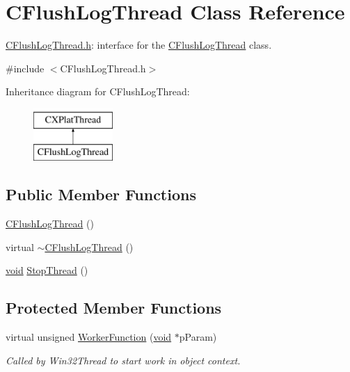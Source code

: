 \hypertarget{class_c_flush_log_thread}{\section{\-C\-Flush\-Log\-Thread \-Class \-Reference}
\label{class_c_flush_log_thread}
}


\hyperlink{_c_flush_log_thread_8h}{\-C\-Flush\-Log\-Thread.\-h}\-: interface for the \hyperlink{class_c_flush_log_thread}{\-C\-Flush\-Log\-Thread} class.  




{\ttfamily \#include $<$\-C\-Flush\-Log\-Thread.\-h$>$}

\-Inheritance diagram for \-C\-Flush\-Log\-Thread\-:\begin{figure}[H]
\begin{center}
\leavevmode
\includegraphics[height=2.000000cm]{class_c_flush_log_thread}
\end{center}
\end{figure}
\subsection*{\-Public \-Member \-Functions}
\begin{DoxyCompactItemize}
\item 
\hyperlink{class_c_flush_log_thread_a583363a6e1af4601901d406254791ce5}{\-C\-Flush\-Log\-Thread} ()
\item 
virtual \hyperlink{class_c_flush_log_thread_ab91f0358dc76376160e69c835d41a7f7}{$\sim$\-C\-Flush\-Log\-Thread} ()
\item 
\hyperlink{_cpclient_8h_a6464f7480a0fd0ee170cba12b2c0497f}{void} \hyperlink{class_c_flush_log_thread_af9c29274e8b380a87d9e5d90e57e72ce}{\-Stop\-Thread} ()
\end{DoxyCompactItemize}
\subsection*{\-Protected \-Member \-Functions}
\begin{DoxyCompactItemize}
\item 
virtual unsigned \hyperlink{class_c_flush_log_thread_a05b87f7942b745eb6a0f128b564cc9f6}{\-Worker\-Function} (\hyperlink{_cpclient_8h_a6464f7480a0fd0ee170cba12b2c0497f}{void} $\ast$p\-Param)
\begin{DoxyCompactList}\small\item\em \-Called by \-Win32\-Thread to start work in object context. \end{DoxyCompactList}\end{DoxyCompactItemize}
